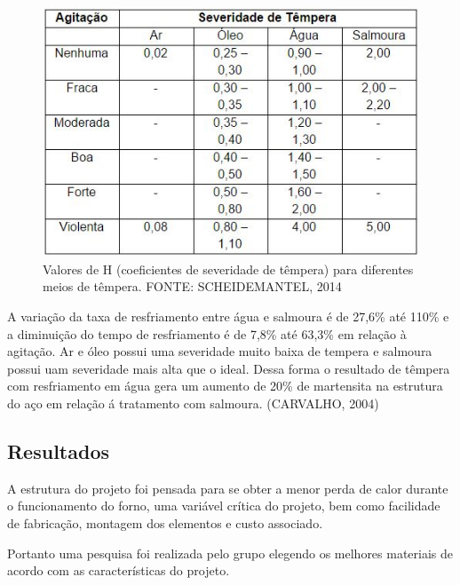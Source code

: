 \begin{figure}[!ht]
	\centering
	\label{tab_valoresH}
	\includegraphics[keepaspectratio=true,scale=0.8]{figuras/tab_valoresH.JPG}
	\caption{Valores de H (coeficientes de severidade de têmpera) para diferentes meios de têmpera. FONTE: SCHEIDEMANTEL, 2014}
\end{figure}

A variação da taxa de resfriamento entre água e salmoura é de 27,6\% até 110\% e a diminuição do tempo de resfriamento é de 7,8\% até 63,3\% em relação à agitação. Ar e óleo possui uma severidade muito baixa de tempera e salmoura possui uam severidade mais alta que o ideal. Dessa forma o resultado de têmpera com resfriamento em água gera um aumento de 20\% de martensita na estrutura do aço em relação á tratamento com salmoura. (CARVALHO, 2004)

\subsection{Resultados}
A estrutura do projeto foi pensada para se obter a menor perda de calor durante o funcionamento do forno, uma variável crítica do projeto, bem como facilidade de fabricação, montagem dos elementos e custo associado.

Portanto uma pesquisa foi realizada pelo grupo elegendo os melhores materiais de acordo com as características do projeto.


